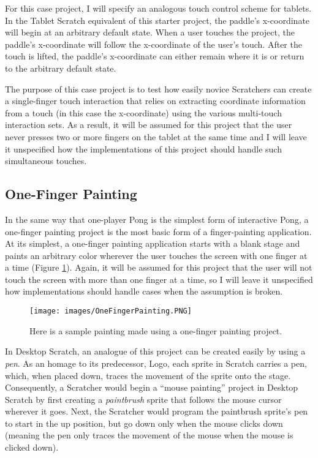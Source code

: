 For this case project, I will specify an analogous touch control scheme for tablets. In the Tablet Scratch equivalent of this starter project, the paddle's x-coordinate will begin at an arbitrary default state. When a user touches the project, the paddle's x-coordinate will follow the x-coordinate of the user's touch. After the touch is lifted, the paddle's x-coordinate can either remain where it is or return to the arbitrary default state. 

The purpose of this case project is to test how easily novice Scratchers can create a single-finger touch interaction that relies on extracting coordinate information from a touch (in this case the x-coordinate) using the various multi-touch interaction sets. As a result, it will be assumed for this project that the user never presses two or more fingers on the tablet at the same time and I will leave it unspecified how the implementations of this project should handle such simultaneous touches.

\subsection{One-Finger Painting}
In the same way that one-player Pong is the simplest form of interactive Pong, a one-finger painting project is the most basic form of a finger-painting application. At its simplest, a one-finger painting application starts with a blank stage and paints an arbitrary color wherever the user touches the screen with one finger at a time (Figure \ref{OneFingerPainting}). Again, it will be assumed for this project that the user will not touch the screen with more than one finger at a time, so I will leave it unspecified how implementations should handle cases when the assumption is broken.

\begin{figure}
\centering
\texttt{[image: images/OneFingerPainting.PNG]}
\caption[One-Finger Painting Screenshot]
{Here is a sample painting made using a one-finger painting project.}
\label{OneFingerPainting}
\end{figure}

In Desktop Scratch, an analogue of this project can be created easily by using a \emph{pen}. As an homage to its predecessor, Logo, each sprite in Scratch carries a pen, which, when placed down, traces the movement of the sprite onto the stage. Consequently, a Scratcher would begin a ``mouse painting'' project in Desktop Scratch by first creating a \emph{paintbrush} sprite that follows the mouse cursor wherever it goes. Next, the Scratcher would program the paintbrush sprite's pen to start in the up position, but go down only when the mouse clicks down (meaning the pen only traces the movement of the mouse when the mouse is clicked down).

